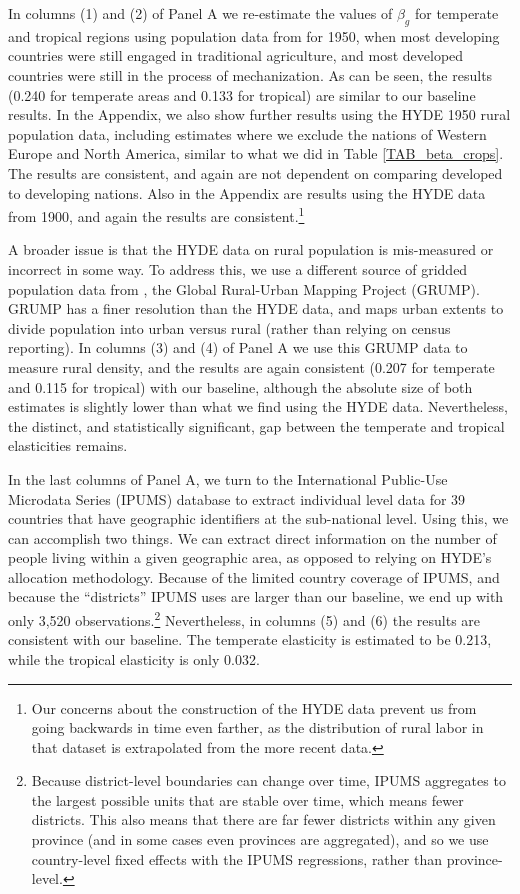 \documentclass[11pt]{article}
\begin{document}
In columns (1) and (2) of Panel A we re-estimate the values of $\beta_g$ for temperate and tropical regions using population data from \citet{hyde31} for 1950, when most developing countries were still engaged in traditional agriculture, and most developed countries were still in the process of mechanization. As can be seen, the results (0.240 for temperate areas and 0.133 for tropical) are similar to our baseline results. In the Appendix, we also show further results using the HYDE 1950 rural population data, including estimates where we exclude the nations of Western Europe and North America, similar to what we did in Table \ref{TAB_beta_crops}. The results are consistent, and again are not dependent on comparing developed to developing nations. Also in the Appendix are results using the HYDE data from 1900, and again the results are consistent.\footnote{Our concerns about the construction of the HYDE data prevent us from going backwards in time even farther, as the distribution of rural labor in that dataset is extrapolated from the more recent data.}

A broader issue is that the HYDE data on rural population is mis-measured or incorrect in some way. To address this, we use a different source of gridded population data from \citep{grump2011}, the Global Rural-Urban Mapping Project (GRUMP). GRUMP has a finer resolution than the HYDE data, and maps urban extents to divide population into urban versus rural (rather than relying on census reporting). In columns (3) and (4) of Panel A we use this GRUMP data to measure rural density, and the results are again consistent (0.207 for temperate and 0.115 for tropical) with our baseline, although the absolute size of both estimates is slightly lower than what we find using the HYDE data. Nevertheless, the distinct, and statistically significant, gap between the temperate and tropical elasticities remains.

In the last columns of Panel A, we turn to the International Public-Use Microdata Series (IPUMS) database \nocite{ipums} to extract individual level data for 39 countries that have geographic identifiers at the sub-national level. Using this, we can accomplish two things. We can extract direct information on the number of people living within a given geographic area, as opposed to relying on HYDE's allocation methodology. Because of the limited country coverage of IPUMS, and because the ``districts'' IPUMS uses are larger than our baseline, we end up with only 3,520 observations.\footnote{Because district-level boundaries can change over time, IPUMS aggregates to the largest possible units that are stable over time, which means fewer districts. This also means that there are far fewer districts within any given province (and in some cases even provinces are aggregated), and so we use country-level fixed effects with the IPUMS regressions, rather than province-level.} Nevertheless, in columns (5) and (6) the results are consistent with our baseline. The temperate elasticity is estimated to be 0.213, while the tropical elasticity is only 0.032. 
\end{document}
